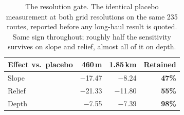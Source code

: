 \begin{table}[t]
\caption{The resolution gate. The identical placebo measurement at both grid
resolutions on the same 235 routes, reported before any long-haul
result is quoted. Same sign throughout; roughly half the sensitivity survives on
slope and relief, almost all of it on depth.}
\label{tab:gate}
\centering\footnotesize
\begin{tabular}{@{}lrrr@{}}
\toprule
Effect vs.\ placebo & 460\,m & 1.85\,km & Retained \\
\midrule
Slope & \ensuremath{-}17.47 & \ensuremath{-}8.24 & \textbf{47\%} \\
Relief & \ensuremath{-}21.33 & \ensuremath{-}11.80 & \textbf{55\%} \\
Depth & \ensuremath{-}7.55 & \ensuremath{-}7.39 & \textbf{98\%} \\
\bottomrule
\end{tabular}
\end{table}
